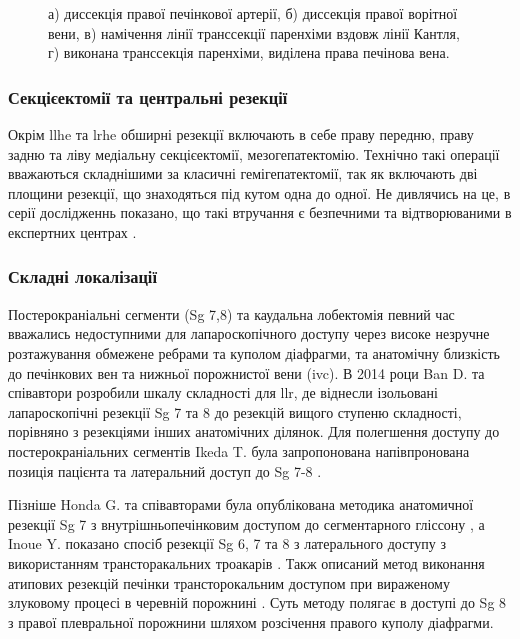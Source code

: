\begin{refsection}
\begin{figure}[h]
\medskip
\small
а) диссекція правої печінкової артерії, б) диссекція правої ворітної вени, в) намічення лінії транссекції паренхіми вздовж лінії Кантля, г) виконана транссекція паренхіми, виділена права печінова вена.


\end{figure}

\subsubsection{Секцієектомії та центральні резекції}

Окрім \acrshort{llhe} та \acrshort{lrhe} обширні резекції включають в себе праву передню, праву задню та ліву медіальну секцієектомії, мезогепатектомію. Технічно такі операції вважаються складнішими за класичні гемігепатектомії, так як включають дві площини резекції, що знаходяться під кутом одна до одної. Не дивлячись на це, в серії дослідженнь показано, що такі втручання є безпечними та відтворюваними в експертних центрах \cite{Honda2014, Cheng2015, Kim2017, Siddiqi2018}. 

\subsubsection{Складні локалізації}

Постерокраніальні сегменти (Sg 7,8) та каудальна лобектомія певний час вважались недоступними для лапароскопічного доступу через високе незручне розтажування обмежене ребрами та куполом діафрагми, та анатомічну близкість до печінкових вен та нижньої порожнистої вени (\acrshort{ivc}). В 2014 роци Ban D. та співавтори розробили шкалу складності для \acrshort{llr}, де віднесли ізольовані лапароскопічні резекції Sg 7 та 8 до резекцій вищого ступеню складності, порівняно з резекціями інших анатомічних ділянок. Для полегшення доступу до постерокраніальних сегментів Ikeda T. була запропонована напівпронована позиція пацієнта та латеральний доступ до Sg 7-8 \cite{Ikeda2014}.

Пізніше Honda G. та співавторами була опублікована методика анатомичної резекції Sg 7 з внутрішньопечінковим доступом до сегментарного  гліссону \cite{Okuda2017}, а Inoue Y. показано спосіб резекції Sg 6, 7 та 8 з латерального доступу з використанням трансторакальних троакарів \cite{Inoue2017}.  Такж описаний метод виконання атипових резекцій печінки трансторокальним доступом при вираженому злуковому процесі в черевній порожнині \cite{Kruger2014}. Суть методу полягає в доступі до Sg 8 з правої плевральної порожнини шляхом розсічення правого куполу діафрагми.


\end{refsection}
